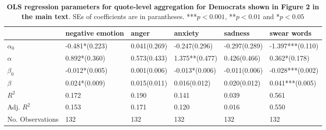 \begin{table}[h]\centering
\caption{\textbf{OLS regression parameters for quote-level aggregation for Democrats shown in Figure 2 in the main text}. SEs of coefficients are in parantheses. ***$p < 0.001$, **$p < 0.01$ and *$p < 0.05$}
	\label{fig: Party_5}
\begin{adjustbox}{width=\linewidth, center}
	\begin{tabular}{llllll}
	\toprule
	{} &                                negative emotion &                                                     anger &                                                   anxiety &                                                   sadness &                                     swear words \\
	\midrule
	$\alpha_0$       &            -0.481*\phantom{*}\phantom{*}(0.223) &  \phantom{-}0.041\phantom{*}\phantom{*}\phantom{*}(0.269) &            -0.247\phantom{*}\phantom{*}\phantom{*}(0.296) &            -0.297\phantom{*}\phantom{*}\phantom{*}(0.289) &                                -1.397***(0.110) \\
	$\alpha$         &  \phantom{-}0.892*\phantom{*}\phantom{*}(0.360) &  \phantom{-}0.573\phantom{*}\phantom{*}\phantom{*}(0.433) &                      \phantom{-}1.375**\phantom{*}(0.477) &  \phantom{-}0.426\phantom{*}\phantom{*}\phantom{*}(0.466) &  \phantom{-}0.362*\phantom{*}\phantom{*}(0.178) \\
	$\beta_0$        &            -0.012*\phantom{*}\phantom{*}(0.005) &  \phantom{-}0.001\phantom{*}\phantom{*}\phantom{*}(0.006) &                      -0.013*\phantom{*}\phantom{*}(0.006) &            -0.011\phantom{*}\phantom{*}\phantom{*}(0.006) &                                -0.028***(0.002) \\
	$\beta$          &  \phantom{-}0.024*\phantom{*}\phantom{*}(0.009) &  \phantom{-}0.015\phantom{*}\phantom{*}\phantom{*}(0.011) &  \phantom{-}0.016\phantom{*}\phantom{*}\phantom{*}(0.012) &  \phantom{-}0.020\phantom{*}\phantom{*}\phantom{*}(0.012) &                      \phantom{-}0.041***(0.005) \\
	$R^2$            &                                           0.172 &                                                     0.190 &                                                     0.141 &                                                     0.039 &                                           0.561 \\
	Adj. $R^2$       &                                           0.153 &                                                     0.171 &                                                     0.120 &                                                     0.016 &                                           0.550 \\
	No. Observations &                                             132 &                                                       132 &                                                       132 &                                                       132 &                                             132 \\
	\bottomrule
	\end{tabular}
	

\end{adjustbox}
\end{table}
